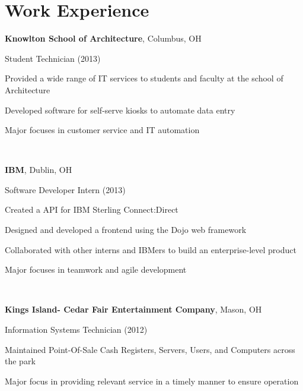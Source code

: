 \documentclass[letterpaper]{resume}
\begin{document}
\section{Work Experience}
\textbf{Knowlton School of Architecture}, Columbus, OH

Student Technician (2013)
\begin{compactitem}
	\item Provided a wide range of IT services to students and faculty at the
		school of Architecture
	\item Developed software for self-serve kiosks to automate data entry
	\item Major focuses in customer service and IT automation
\end{compactitem}

~

\textbf{IBM}, Dublin, OH

Software Developer Intern (2013)
\begin{compactitem}
\item Created a API for IBM Sterling Connect:Direct

\item Designed and developed a frontend using the Dojo web framework

\item Collaborated with other interns and IBMers to build an enterprise-level product

\item Major focuses in teamwork and agile development
\end{compactitem}

~

%
%

\textbf{Kings Island- Cedar Fair Entertainment Company}, Mason, OH

Information Systems Technician (2012)
\begin{compactitem}
\item Maintained Point-Of-Sale Cash Registers, Servers, Users, and Computers across the park



\item Major focus in providing relevant service in a timely manner to ensure operation
\end{compactitem}
\end{document}
